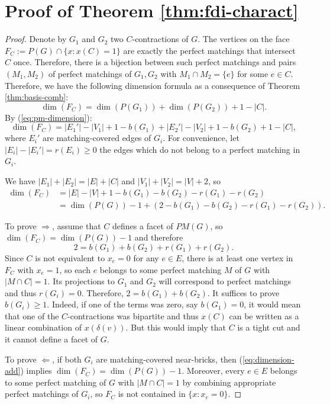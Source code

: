 \documentclass[11pt]{article}
\newcommand{\1}{\mathbf{1}}
\newcommand{\0}{\mathbf{0}}
\begin{document}
\section{Proof of Theorem \ref{thm:fdi-charact}}
\begin{proof}
    Denote by $G_1$ and $G_2$ two $C$-contractions of $G$.
    The vertices on the face $F_C:=P(G)\cap \{x: x(C)=1\}$ are exactly the perfect matchings that intersect $C$ once. Therefore, there is a bijection between such perfect matchings and pairs $(M_1,M_2)$ of perfect matchings of $G_1,G_2$ with $M_1\cap M_2 = \{e\}$ for some $e \in C$.
    Therefore, we have the following dimension formula as a consequence of Theorem \ref{thm:basis-comb}: \begin{equation}
        \dim(F_C)=\dim(P(G_1))+\dim(P(G_2))+1-|C|.
    \end{equation}
    By (\ref{eq:pm-dimension}):\begin{equation*}
        \dim(F_C) = |E_1'|-|V_1|+1-b(G_1)+|E_2'|-|V_2|+1-b(G_2)+1-|C|,
    \end{equation*} where $E_i'$ are matching-covered edges of $G_i$. For convenience, let $|E_i|-|E_i'|=r(E_i)\geq 0$ the edges which do not belong to a perfect matching in $G_i$. 
    
    We have $|E_1|+|E_2|=|E|+|C|$ and $|V_1|+|V_2|=|V|+2$, so \begin{align}\label{eq:dimension-add}
        \dim(F_C)&=|E|-|V|+1-b(G_1)-b(G_2)-r(G_1)-r(G_2) \\&= \dim(P(G))-1 + (2-b(G_1)-b(G_2)-r(G_1)-r(G_2)).
    \end{align}

    To prove $\Rightarrow$, assume that $C$ defines a facet of $PM(G)$, so $\dim(F_C)=\dim(P(G))-1$ and therefore \begin{equation*}
        2 = b(G_1)+b(G_2)+r(G_1)+r(G_2).
    \end{equation*} Since $C$ is not equivalent to $x_e=0$ for any $e\in E$, there is at least one vertex in $F_C$ with $x_e=1$, so each $e$ belongs to some perfect matching $M$ of $G$ with $|M\cap C|=1$. Its projections to $G_1$ and $G_2$ will correspond to perfect matchings and thus $r(G_i)=0$. Therefore, $2 = b(G_1)+b(G_2)$. It suffices to prove $b(G_i)\geq 1$. Indeed, if one of the terms was zero, say $b(G_1)=0$, it would mean that one of the $C$-contractions was bipartite and thus $x(C)$ can be written as a linear combination of $x(\delta(v))$. But this would imply that $C$ is a tight cut and it cannot define a facet of $G$.

    To prove $\Leftarrow$, if both $G_i$ are matching-covered near-bricks, then (\ref{eq:dimension-add}) implies $\dim(F_C)=\dim(P(G))-1$. Moreover, every $e\in E$ belongs to some perfect matching of $G$ with $|M\cap C|=1$ by combining appropriate perfect matchings of $G_i$, so $F_C$ is not contained in $\{x:x_e=0\}$.
\end{proof}
\end{document}
